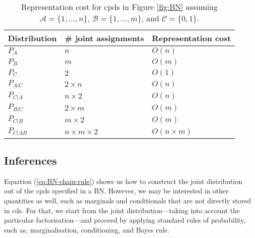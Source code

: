 \begin{table}[h]\centering
\begin{tabular}{l l l}
Distribution & \# joint assignments & Representation cost \\ \hline
$P_A$ & $n$ & $O(n)$ \\ 
$P_B$ & $m$ & $O(m)$ \\
$P_C$ & $2$ & $O(1)$ \\
$P_{A|C}$ & $2\times n$ & $O(n)$ \\
$P_{C|A}$ & $n \times 2$ & $O(n)$ \\
$P_{B|C}$ & $2 \times m$ & $O(m)$ \\
$P_{C|B}$ & $m \times 2$ & $O(m)$ \\
$P_{C|AB}$ & $n \times m \times 2$ & $O(n \times m)$
\end{tabular}
\caption{\label{tab:cost}Representation cost for cpds in Figure \ref{fig:BN} assuming $\mathcal A=\{1, \ldots, n\}$, $\mathcal B =\{1, \ldots, m\}$, and $\mathcal C =\{0, 1\}$.}
\end{table}
	
	
\subsection{Inferences}	

Equation (\ref{eq:BN-chain-rule}) shows us how to construct the joint distribution out of the cpds specified in a BN.
However, we may be interested in other quantities as well, such as marginals and conditionals that are not directly stored in cds. 
For that, we start from the joint distribution---taking into account the particular factorisation---and proceed by applying standard rules of probability, such as, marginalisation, conditioning, and Bayes rule. 

